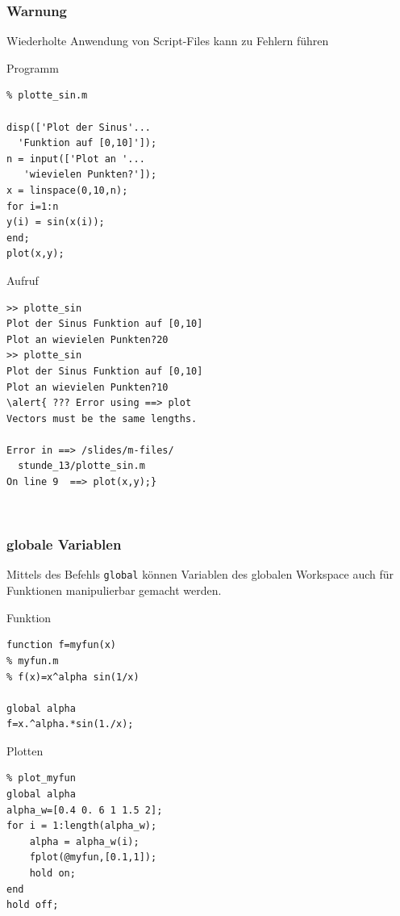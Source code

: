 \begin{frame}[fragile]\frametitle{Warnung}
\begin{center}
\alert{ Wiederholte Anwendung von Script-Files kann zu Fehlern führen}\\[0.7cm]
\end{center}
\begin{minipage}{5cm}
\alert{ Programm}
\begin{lstlisting}
% plotte_sin.m

disp(['Plot der Sinus'...
  'Funktion auf [0,10]']);
n = input(['Plot an '...
   'wievielen Punkten?']);
x = linspace(0,10,n);
for i=1:n
y(i) = sin(x(i));
end; 
plot(x,y);
\end{lstlisting}
\end{minipage} \hfill
\begin{minipage}{5cm}
\alert{ Aufruf}
\begin{lstlisting}
>> plotte_sin
Plot der Sinus Funktion auf [0,10]
Plot an wievielen Punkten?20
>> plotte_sin
Plot der Sinus Funktion auf [0,10]
Plot an wievielen Punkten?10
\alert{ ??? Error using ==> plot
Vectors must be the same lengths.

Error in ==> /slides/m-files/
  stunde_13/plotte_sin.m
On line 9  ==> plot(x,y);}
\end{lstlisting}
\end{minipage} \\
\end{frame}
%
%
\begin{frame}[fragile]\frametitle{globale Variablen}
Mittels des Befehls \alert{ \lstinline!global!} können Variablen des
globalen Workspace auch für
Funktionen manipulierbar gemacht werden.\\[0.6cm]
\begin{minipage}{5cm}
\alert{ Funktion}
\begin{lstlisting}
function f=myfun(x)
% myfun.m
% f(x)=x^alpha sin(1/x)

global alpha
f=x.^alpha.*sin(1./x);
\end{lstlisting}
\end{minipage} \hfill
\begin{minipage}{5cm}
\alert{ Plotten}
\begin{lstlisting}
% plot_myfun
global alpha
alpha_w=[0.4 0. 6 1 1.5 2];
for i = 1:length(alpha_w);
    alpha = alpha_w(i);
    fplot(@myfun,[0.1,1]);
    hold on;
end
hold off;
\end{lstlisting}
\end{minipage} \\
\end{frame}
